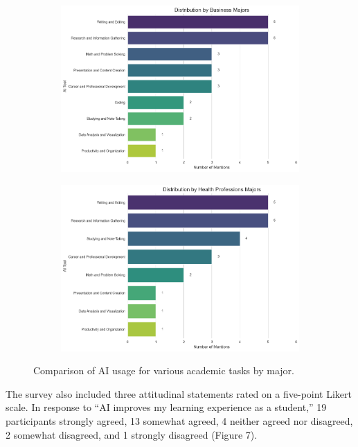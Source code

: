 \documentclass[12pt]{article}
\begin{document}
\begin{figure}[H]
\begin{subfigure}[b]{0.49\textwidth}
    \includegraphics[width=\textwidth]{fig6-3.png} %
    \label{fig:subfig1b}
  \end{subfigure}
  \begin{subfigure}[b]{0.49\textwidth}
    \includegraphics[width=\textwidth]{fig6-4.png} %
    \label{fig:subfig1b}
  \end{subfigure}
  \caption{Comparison of AI usage for various academic tasks by major.}
  \label{fig:subfigures1}
\end{figure}


The survey also included three attitudinal statements rated on a five-point Likert scale. In response to “AI improves my learning experience as a student,” 19 participants strongly agreed, 13 somewhat agreed, 4 neither agreed nor disagreed, 2 somewhat disagreed, and 1 strongly disagreed (Figure 7).
\end{document}
